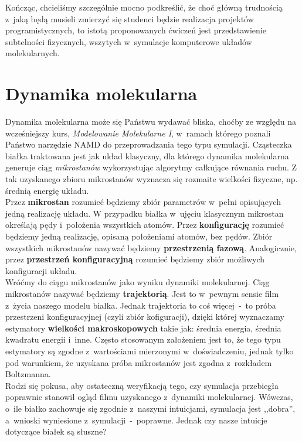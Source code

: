 \documentclass[a4paper,11pt,twoside]{book}
\begin{document}
Kończąc, chcieliśmy szczególnie mocno podkreślić, że choć główną trudnością z~jaką będą musieli zmierzyć się studenci będzie realizacja projektów programistycznych, to istotą proponowanych ćwiczeń jest przedstawienie subtelności fizycznych, wszytych w~symulacje komputerowe układów molekularnych.
\section{Dynamika molekularna} 
Dynamika molekularna może się Państwu wydawać bliska, choćby ze względu na wcześniejszy kurs, \emph{Modelowanie Molekularne I}, w~ramach którego poznali Państwo narzędzie NAMD do przeprowadzania tego typu symulacji. Cząsteczka białka traktowana jest jak układ klasyczny, dla którego dynamika molekularna generuje ciąg \emph{mikrostanów} wykorzystując algorytmy całkujące równania ruchu. Z tak uzyskanego zbioru mikrostanów wyznacza się rozmaite wielkości fizyczne, np. średnią energię układu.\\

Przez {\bf mikrostan} rozumieć będziemy zbiór parametrów w~pełni opisujących jedną realizację układu. W przypadku białka w~ujęciu klasycznym mikrostan określają pędy i~położenia wszystkich atomów. Przez {\bf konfigurację} rozumieć będziemy jedną realizację, opisaną położeniami atomów, bez pędów. Zbiór wszystkich mikrostanów nazywać będziemy {\bf przestrzenią fazową}. Analogicznie, przez {\bf przestrzeń konfiguracyjną} rozumieć będziemy zbiór możliwych konfiguracji układu.\\

Wróćmy do ciągu mikrostanów jako wyniku dynamiki molekularnej. Ciąg mikrostanów nazywać będziemy {\bf trajektorią}. Jest to w~pewnym sensie film z~życia naszego modelu białka. Jednak trajektoria to coś więcej~-~to próba przestrzeni konfiguracyjnej (czyli zbiór kofiguracji), dzięki której wyznaczamy estymatory {\bf wielkości makroskopowych} takie jak: średnia energia, średnia kwadratu energii i~inne. Często stosowanym założeniem jest to, że tego typu estymatory są zgodne z~wartościami mierzonymi w~doświadczeniu, jednak tylko pod warunkiem, że uzyskana próba mikrostanów jest zgodna z~rozkładem Boltzmanna.\\

Rodzi się pokusa, aby ostateczną weryfikacją tego, czy symulacja przebiegła poprawnie stanowił ogląd filmu uzyskanego z~dynamiki molekularnej. Wówczas, o~ile białko zachowuje się zgodnie z~naszymi intuicjami, symulacja jest ,,dobra'', a~wnioski wyniesione z~symulacji~-~poprawne. Jednak czy nasze intuicje dotyczące białek są słuszne?\\
\end{document}
